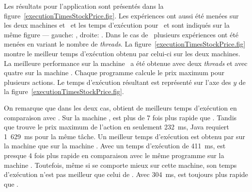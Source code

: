


Les r\'esultats  pour l'application  sont pr\'esent\'es dans la figure~\ref{executionTimesStockPrice.fig}. Les expériences ont aussi \'et\'e menées sur les deux machines  et~ et les temps d'ex\'ecution pour \ppff\ et  sont indiqu\'es sur la m\^eme figure --- gauche: , droite: . 
%
Dans le cas de \ppff\, plusieurs exp\'eriences ont \'et\'e men\'ees en variant le nombre de \emph{threads}. La figure~\ref{executionTimesStockPrice.fig} montre le meilleur temps d'ex\'ecution obtenu par celui-ci sur les deux machines. La meilleure performance sur la machine \ a \'et\'e obtenue avec deux \emph{threads} et avec quatre sur la machine .
%
Chaque programme calcule le prix maximum pour plusieurs actions. Le temps d'ex\'ecution r\'esultant est repr\'esent\'e sur l'axe des $y$ de la figure~\ref{executionTimesStockPrice.fig}. 

On remarque que dans les deux cas,  obtient de meilleurs temps d'ex\'ecution en comparaison avec . Sur la machine ,  est plus de 7 fois plus rapide que . Tandis que  trouve le prix maximum de l'action en seulement 232~ms, Java requiert 1~629~ms pour la m\^eme t\^ache. Un meilleur temps d'ex\'ecution est obtenu par  sur la machine  que sur la machine . Avec un temps d'ex\'ecution de 411~ms,  est presque 4 fois plus rapide en comparaison avec le m\^eme programme  sur la machine . Toutefois, m\^eme si  se comporte mieux sur cette machine, son temps d'ex\'ecution n'est pas meilleur que celui de . Avec 304~ms,  est toujours plus rapide que . 





